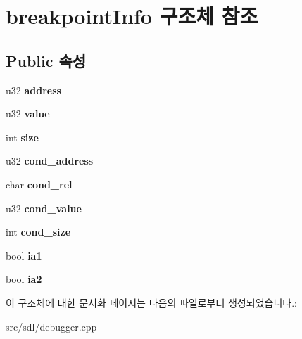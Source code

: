 \hypertarget{structbreakpoint_info}{}\section{breakpoint\+Info 구조체 참조}
\label{structbreakpoint_info}
\subsection*{Public 속성}
\begin{DoxyCompactItemize}
\item 
\mbox{\label{structbreakpoint_info_ab0cc4bdc931703296ec18aaa1e2242f4}} 
u32 {\bfseries address}
\item 
\mbox{\label{structbreakpoint_info_a10cf821e6c0c5b11b921baafa0144448}} 
u32 {\bfseries value}
\item 
\mbox{\label{structbreakpoint_info_a39a2c2fabe9c630917e8131a99ce61ec}} 
int {\bfseries size}
\item 
\mbox{\label{structbreakpoint_info_a4a83f60b18f30afe9fa114b21f02de22}} 
u32 {\bfseries cond\+\_\+address}
\item 
\mbox{\label{structbreakpoint_info_a6819ea8a99055196410b1070f9750f70}} 
char {\bfseries cond\+\_\+rel}
\item 
\mbox{\label{structbreakpoint_info_a06f4bafc5e974ae0adf0e3bf651d2afd}} 
u32 {\bfseries cond\+\_\+value}
\item 
\mbox{\label{structbreakpoint_info_a4c2f4f1b0f74562121d829e864d73a0e}} 
int {\bfseries cond\+\_\+size}
\item 
\mbox{\label{structbreakpoint_info_a6d1174b3ac7266b9454683ee36030b97}} 
bool {\bfseries ia1}
\item 
\mbox{\label{structbreakpoint_info_a5c43894b7302cbb085204b39a14dda91}} 
bool {\bfseries ia2}
\end{DoxyCompactItemize}


이 구조체에 대한 문서화 페이지는 다음의 파일로부터 생성되었습니다.\+:\begin{DoxyCompactItemize}
\item 
src/sdl/debugger.\+cpp\end{DoxyCompactItemize}
